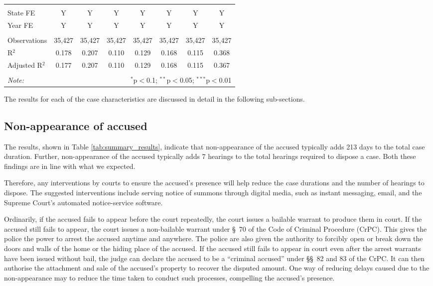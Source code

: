 {\begin{longtable}{lccccccc}
 \hline \\[-1.8ex]
 State FE & Y & Y & Y & Y & Y & Y & Y \\ 
 Year FE & Y & Y & Y & Y & Y & Y & Y \\ 
 \hline \\[-1.8ex] 
 Observations & 35,427 & 35,427 & 35,427 & 35,427 & 35,427 & 35,427 & 35,427 \\ 
 R$^{2}$ & 0.178 & 0.207 & 0.110 & 0.129 & 0.168 & 0.115 & 0.368 \\ 
 Adjusted R$^{2}$ & 0.177 & 0.207 & 0.110 & 0.129 & 0.168 & 0.115 & 0.367 \\ 
 \hline \\[-1.8ex] 
 \textit{Note:} & \multicolumn{7}{r}{$^{*}$p$<$0.1; $^{**}$p$<$0.05; $^{***}$p$<$0.01} \\ 
\end{longtable}}

The results for each of the case characteristics are discussed in detail in the following sub-sections.

\subsection{Non-appearance of accused}
\label{sec:non-appe-accus-1}

The results, shown in Table \ref{tab:summary_results}, indicate that non-appearance of the accused typically adds 213 days to the total case duration. Further, non-appearance of the accused typically adds 7 hearings to the total hearings required to dispose a case. Both these findings are in line with what we expected.

Therefore, any interventions by courts to ensure the accused's presence will help reduce the case durations and the number of hearings to dispose. The suggested interventions include serving notice of summons through digital media, such as instant messaging, email, and the Supreme Court's automated notice-service software.

Ordinarily, if the accused fails to appear before the court repeatedly, the court issues a bailable warrant to produce them in court. If the accused still fails to appear, the court issues a non-bailable warrant under \S~70 of the Code of Criminal Procedure (CrPC). This gives the police the power to arrest the accused anytime and anywhere. The police are also given the authority to forcibly open or break down the doors and walls of the home or the hiding place of the accused. If the accused still fails to appear in court even after the arrest warrants have been issued without bail, the judge can declare the accused to be a ``criminal accused'' under \S\S~82 and 83 of the CrPC. It can then authorise the attachment and sale of the accused's property to recover the disputed amount. One way of reducing delays caused due to the non-appearance may to reduce the time taken to conduct such processes, compelling the accused's presence.

